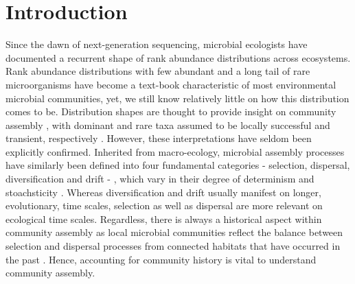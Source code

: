 \documentclass[12pt,a4paper]{article} %
\begin{document}
\section*{Introduction}
Since the dawn of next-generation sequencing, microbial ecologists have documented a recurrent shape of rank abundance distributions across ecosystems. Rank abundance distributions with few abundant and a long tail of rare microorganisms have become a text-book characteristic of most environmental microbial communities, yet, we still know relatively little on how this distribution comes to be. Distribution shapes are thought to provide insight on community assembly \citep{McGill2007}, with dominant and rare taxa assumed to be locally successful and transient, respectively \citep{Magurran2003, Nakadai2020}. However, these interpretations have seldom been explicitly confirmed. Inherited from macro-ecology, microbial assembly processes have similarly been defined into four fundamental categories - selection, dispersal, diversification and drift - \citep{Vellend2010}, which vary in their degree of determinism and stoachsticity \citep{Zhou2017}. Whereas diversification and drift usually manifest on longer, evolutionary, time scales, selection as well as dispersal are more relevant on ecological time scales. Regardless, there is always a historical aspect within community assembly as local microbial communities reflect the balance between selection and dispersal processes from connected habitats that have occurred in the past \citep{Fukami2004}. Hence, accounting for community history is vital to understand community assembly.
\end{document}
